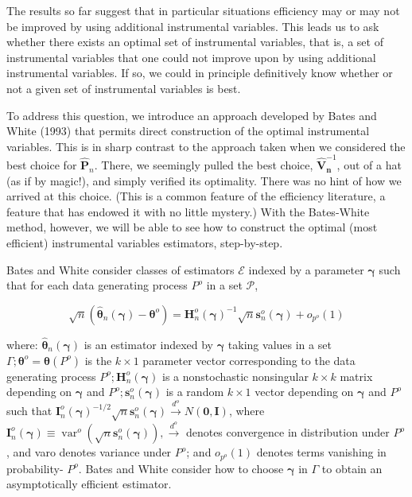 \documentclass[10pt]{article}
\begin{document}
The results so far suggest that in particular situations efficiency may or may not be improved by using additional instrumental variables. This leads us to ask whether there exists an optimal set of instrumental variables, that is, a set of instrumental variables that one could not improve upon by using additional instrumental variables. If so, we could in principle definitively know whether or not a given set of instrumental variables is best.

To address this question, we introduce an approach developed by Bates and White (1993) that permits direct construction of the optimal instrumental variables. This is in sharp contrast to the approach taken when we considered the best choice for $\hat{\mathbf{P}}_{n}$. There, we seemingly pulled the best choice, $\hat{\mathbf{V}}_{\boldsymbol{n}}^{-1}$, out of a hat (as if by magic!), and simply verified its optimality. There was no hint of how we arrived at this choice. (This is a common feature of the efficiency literature, a feature that has endowed it with no little mystery.) With the Bates-White method, however, we will be able to see how to construct the optimal (most efficient) instrumental variables estimators, step-by-step.

Bates and White consider classes of estimators $\mathcal{E}$ indexed by a parameter $\boldsymbol{\gamma}$ such that for each data generating process $P^{o}$ in a set $\mathcal{P}$,


\begin{equation*}
\sqrt{n}\left(\hat{\boldsymbol{\theta}}_{n}(\boldsymbol{\gamma})-\boldsymbol{\theta}^{o}\right)=\mathbf{H}_{n}^{o}(\boldsymbol{\gamma})^{-1} \sqrt{n} \mathbf{s}_{n}^{o}(\boldsymbol{\gamma})+o_{p^{o}}(1) \tag{4.1}
\end{equation*}


where: $\hat{\boldsymbol{\theta}}_{n}(\boldsymbol{\gamma})$ is an estimator indexed by $\boldsymbol{\gamma}$ taking values in a set $\Gamma ; \boldsymbol{\theta}^{o}= \boldsymbol{\theta}\left(P^{o}\right)$ is the $k \times 1$ parameter vector corresponding to the data generating process $P^{o} ; \mathbf{H}_{n}^{o}(\boldsymbol{\gamma})$ is a nonstochastic nonsingular $k \times k$ matrix depending on $\boldsymbol{\gamma}$ and $P^{o} ; \mathbf{s}_{n}^{o}(\boldsymbol{\gamma})$ is a random $k \times 1$ vector depending on $\boldsymbol{\gamma}$ and $P^{o}$ such that $\mathbf{I}_{n}^{o}(\boldsymbol{\gamma})^{-1 / 2} \sqrt{n} \mathbf{s}_{n}^{o}(\boldsymbol{\gamma}) \xrightarrow{d^{o}} N(\mathbf{0}, \mathbf{I})$, where $\mathbf{I}_{n}^{o}(\boldsymbol{\gamma}) \equiv \operatorname{var}^{o}\left(\sqrt{n} \mathbf{s}_{n}^{o}(\boldsymbol{\gamma})\right), \xrightarrow{d^{o}}$ denotes convergence in distribution under $P^{o}$, and varo denotes variance under $P^{o}$; and $o_{p^{o}}(1)$ denotes terms vanishing in probability- $P^{o}$. Bates and White consider how to choose $\boldsymbol{\gamma}$ in $\Gamma$ to obtain an asymptotically efficient estimator.
\end{document}
